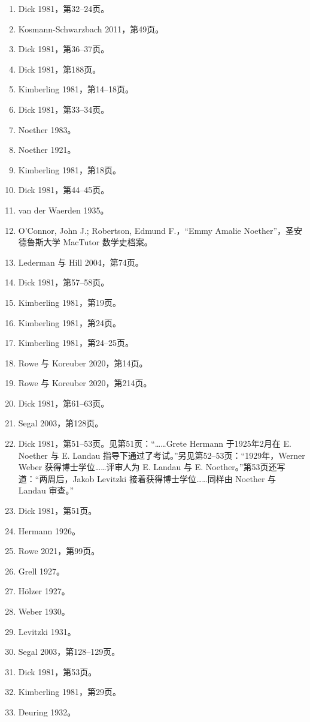 \begin{enumerate}
\item Dick 1981，第32–24页。
\item Kosmann-Schwarzbach 2011，第49页。
\item Dick 1981，第36–37页。
\item Dick 1981，第188页。
\item Kimberling 1981，第14–18页。
\item Dick 1981，第33–34页。
\item Noether 1983。
\item Noether 1921。
\item Kimberling 1981，第18页。
\item Dick 1981，第44–45页。
\item van der Waerden 1935。
\item O'Connor, John J.; Robertson, Edmund F.，“Emmy Amalie Noether”，圣安德鲁斯大学 MacTutor 数学史档案。
\item Lederman 与 Hill 2004，第74页。
\item Dick 1981，第57–58页。
\item Kimberling 1981，第19页。
\item Kimberling 1981，第24页。
\item Kimberling 1981，第24–25页。
\item Rowe 与 Koreuber 2020，第14页。
\item Rowe 与 Koreuber 2020，第214页。
\item Dick 1981，第61–63页。
\item Segal 2003，第128页。
\item Dick 1981，第51–53页。见第51页：“……Grete Hermann 于1925年2月在 E. Noether 与 E. Landau 指导下通过了考试。”另见第52–53页：“1929年，Werner Weber 获得博士学位……评审人为 E. Landau 与 E. Noether。”第53页还写道：“两周后，Jakob Levitzki 接着获得博士学位……同样由 Noether 与 Landau 审查。”
\item Dick 1981，第51页。
\item Hermann 1926。
\item Rowe 2021，第99页。
\item Grell 1927。
\item Hölzer 1927。
\item Weber 1930。
\item Levitzki 1931。
\item Segal 2003，第128–129页。
\item Dick 1981，第53页。
\item Kimberling 1981，第29页。
\item Deuring 1932。

\end{enumerate}
